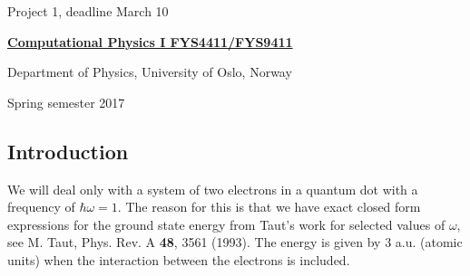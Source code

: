 \documentclass[%
oneside,                 %
final,                   %
10pt]{article}
\begin{document}

\newcommand{\exercisesection}[1]{\subsection*{#1}}






\thispagestyle{empty}

\begin{center}
{\LARGE\bf
\begin{spacing}{1.25}
Project 1, deadline  March 10 
\end{spacing}
}
\end{center}


\begin{center}
{\bf \href{{http://www.uio.no/studier/emner/matnat/fys/FYS4411/index-eng.html}}{Computational Physics I FYS4411/FYS9411}}
\end{center}

    \begin{center}
\centerline{{\small Department of Physics, University of Oslo, Norway}}
\end{center}
    

\begin{center}
Spring semester 2017
\end{center}

\vspace{1cm}


\subsection*{Introduction}

We will deal only with a system of 
two electrons in a quantum dot with a frequency of $\hbar\omega = 1$. 
The reason for this is that we have exact closed form expressions 
for the ground state energy from Taut's work for selected values of $\omega$, 
see M. Taut, Phys. Rev. A \textbf{48}, 3561 (1993).
The energy is given by $3$ a.u.  (atomic units) when the interaction between the electrons is included.
\end{document}
